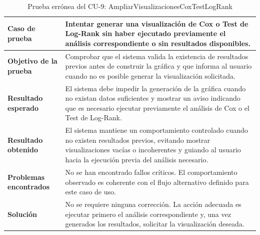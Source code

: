 \begin{table}[H]
\centering
\small
\begin{tabularx}{\textwidth}{|p{}|X|}
\hline
\textbf{Caso de prueba} & Intentar generar una visualización de Cox o Test de Log-Rank sin haber ejecutado previamente el análisis correspondiente o sin resultados disponibles. \\ \hline
\textbf{Objetivo de la prueba} & Comprobar que el sistema valida la existencia de resultados previos antes de construir la gráfica y que informa al usuario cuando no es posible generar la visualización solicitada. \\ \hline
\textbf{Resultado esperado} & El sistema debe impedir la generación de la gráfica cuando no existan datos suficientes y mostrar un aviso indicando que es necesario ejecutar previamente el análisis de Cox o el Test de Log-Rank. \\ \hline
\textbf{Resultado obtenido} & El sistema mantiene un comportamiento controlado cuando no existen resultados previos, evitando mostrar visualizaciones vacías o incoherentes y guiando al usuario hacia la ejecución previa del análisis necesario. \\ \hline
\textbf{Problemas encontrados} & No se han encontrado fallos críticos. El comportamiento observado es coherente con el flujo alternativo definido para este caso de uso. \\ \hline
\textbf{Solución} & No se requiere ninguna corrección. La acción adecuada es ejecutar primero el análisis correspondiente y, una vez generados los resultados, solicitar la visualización deseada. \\ \hline
\end{tabularx}
\caption{Prueba errónea del CU-9: AmpliarVisualizacionesCoxTestLogRank}
\label{tab:prueba_erronea_cu9}
\normalsize
\end{table}
